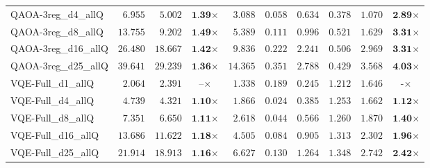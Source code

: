 \begin{table*}[t]
{\begin{tabular}{| l || r r c || r r r r r c |}
QAOA-3reg\_d4\_allQ & $6.955$ & $5.002$ & $\textbf{1.39}$$\times$ & $3.088$ & $0.058$ & $0.634$ & $0.378$ & $1.070$ & $\textbf{2.89}$$\times$ \\
QAOA-3reg\_d8\_allQ & $13.755$ & $9.202$ & $\textbf{1.49}$$\times$ & $5.389$ & $0.111$ & $0.996$ & $0.521$ & $1.629$ & $\textbf{3.31}$$\times$ \\
QAOA-3reg\_d16\_allQ & $26.480$ & $18.667$ & $\textbf{1.42}$$\times$ & $9.836$ & $0.222$ & $2.241$ & $0.506$ & $2.969$ & $\textbf{3.31}$$\times$ \\
QAOA-3reg\_d25\_allQ & $39.641$ & $29.239$ & $\textbf{1.36}$$\times$ & $14.365$ & $0.351$ & $2.788$ & $0.429$ & $3.568$ & $\textbf{4.03}$$\times$ \\
VQE-Full\_d1\_allQ & $2.064$ & $2.391$ & $\textbf{--}$$\times$ & $1.338$ & $0.189$ & $0.245$ & $1.212$ & $1.646$ & $\textbf{-}$$\times$ \\
VQE-Full\_d4\_allQ & $4.739$ & $4.321$ & $\textbf{1.10}$$\times$ & $1.866$ & $0.024$ & $0.385$ & $1.253$ & $1.662$ & $\textbf{1.12}$$\times$ \\
VQE-Full\_d8\_allQ & $7.351$ & $6.650$ & $\textbf{1.11}$$\times$ & $2.618$ & $0.044$ & $0.566$ & $1.260$ & $1.870$ & $\textbf{1.40}$$\times$ \\
VQE-Full\_d16\_allQ & $13.686$ & $11.622$ & $\textbf{1.18}$$\times$ & $4.505$ & $0.084$ & $0.905$ & $1.313$ & $2.302$ & $\textbf{1.96}$$\times$ \\
VQE-Full\_d25\_allQ & $21.914$ & $18.913$ & $\textbf{1.16}$$\times$ & $6.627$ & $0.130$ & $1.264$ & $1.348$ & $2.742$ & $\textbf{2.42}$$\times$ \\
\hline
\end{tabular}
}
\end{table*}
